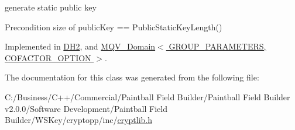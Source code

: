 generate static public key \begin{DoxyPrecond}{Precondition}
size of publicKey == PublicStaticKeyLength() 
\end{DoxyPrecond}


Implemented in \hyperlink{class_d_h2_a7151a0d3e0ab520aef0b61c70f59a50a}{DH2}, and \hyperlink{class_m_q_v___domain_a61fa5fd2199f8b5ce450002ac61072d2}{MQV\_\-Domain$<$ GROUP\_\-PARAMETERS, COFACTOR\_\-OPTION $>$}.

The documentation for this class was generated from the following file:\begin{DoxyCompactItemize}
\item 
C:/Business/C++/Commercial/Paintball Field Builder/Paintball Field Builder v2.0.0/Software Development/Paintball Field Builder/WSKey/cryptopp/inc/\hyperlink{cryptlib_8h}{cryptlib.h}\end{DoxyCompactItemize}
